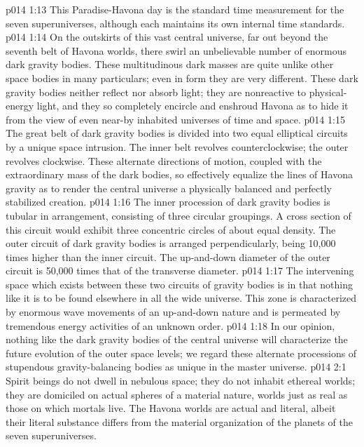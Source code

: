 \vs p014 1:13 This Paradise\hyp{}Havona day is the standard time measurement for the seven superuniverses, although each maintains its own internal time standards.
\vs p014 1:14 \pc On the outskirts of this vast central universe, far out beyond the seventh belt of Havona worlds, there swirl an unbelievable number of enormous dark gravity bodies. These multitudinous dark masses are quite unlike other space bodies in many particulars; even in form they are very different. These dark gravity bodies neither reflect nor absorb light; they are nonreactive to physical\hyp{}energy light, and they so completely encircle and enshroud Havona as to hide it from the view of even near\hyp{}by inhabited universes of time and space.
\vs p014 1:15 The great belt of dark gravity bodies is divided into two equal elliptical circuits by a unique space intrusion. The inner belt revolves counterclockwise; the outer revolves clockwise. These alternate directions of motion, coupled with the extraordinary mass of the dark bodies, so effectively equalize the lines of Havona gravity as to render the central universe a physically balanced and perfectly stabilized creation.
\vs p014 1:16 The inner procession of dark gravity bodies is tubular in arrangement, consisting of three circular groupings. A cross section of this circuit would exhibit three concentric circles of about equal density. The outer circuit of dark gravity bodies is arranged perpendicularly, being 10,000 times higher than the inner circuit. The up\hyp{}and\hyp{}down diameter of the outer circuit is 50,000 times that of the transverse diameter.
\vs p014 1:17 The intervening space which exists between these two circuits of gravity bodies is  in that nothing like it is to be found elsewhere in all the wide universe. This zone is characterized by enormous wave movements of an up\hyp{}and\hyp{}down nature and is permeated by tremendous energy activities of an unknown order.
\vs p014 1:18 In our opinion, nothing like the dark gravity bodies of the central universe will characterize the future evolution of the outer space levels; we regard these alternate processions of stupendous gravity\hyp{}balancing bodies as unique in the master universe.
\vs p014 2:1 Spirit beings do not dwell in nebulous space; they do not inhabit ethereal worlds; they are domiciled on actual spheres of a material nature, worlds just as real as those on which mortals live. The Havona worlds are actual and literal, albeit their literal substance differs from the material organization of the planets of the seven superuniverses.
